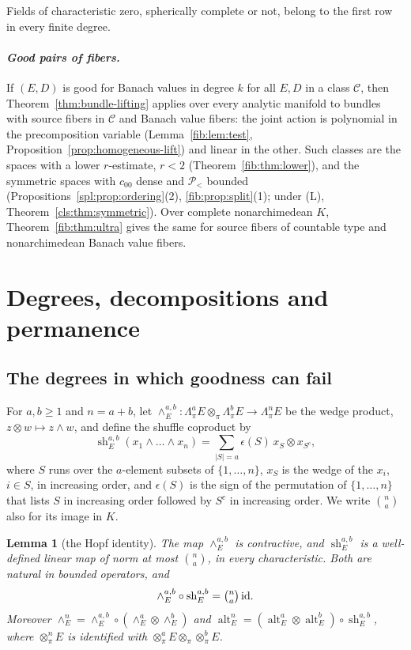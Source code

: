 \documentclass[11pt]{amsart}
\newtheorem{lemma}[theorem]{Lemma}
\theoremstyle{definition}
\theoremstyle{remark}
\numberwithin{equation}{section}
\newcommand{\id}{\mathrm{id}}
\newcommand{\abs}[1]{\lvert #1\rvert}
\newcommand{\cC}{\mathcal{C}}
\theoremstyle{plain}
\theoremstyle{definition}
\theoremstyle{plain}
\newcommand{\cP}{\mathcal P}
\begin{document}
Fields of characteristic zero, spherically complete or not, belong to the first row in every finite degree.

\paragraph{\textit{Good pairs of fibers.}}
If $(E,D)$ is good for Banach values in degree $k$ for all $E,D$ in a class $\cC$, then Theorem~\ref{thm:bundle-lifting}
applies over every analytic manifold to bundles with source fibers in $\cC$ and Banach value fibers: the joint action is
polynomial in the precomposition variable (Lemma~\ref{fib:lem:test}, Proposition~\ref{prop:homogeneous-lift}) and linear
in the other. Such classes are the spaces with a lower $r$-estimate, $r<2$ (Theorem~\ref{fib:thm:lower}), and the
symmetric spaces with $c_{00}$ dense and $\cP_<$ bounded (Propositions~\ref{spl:prop:ordering}(2), \ref{fib:prop:split}(1);
under \textup{(L)}, Theorem~\ref{cls:thm:symmetric}). Over complete nonarchimedean $K$, Theorem~\ref{fib:thm:ultra} gives
the same for source fibers of countable type and nonarchimedean Banach value fibers.
\section{Degrees, decompositions and permanence}\label{sec:combining}

\subsection{The degrees in which goodness can fail}\label{cmb:ssec:degrees}
For $a,b\ge1$ and $n=a+b$, let $\wedge^{a,b}_E\colon\Lambda^a_\pi E\otimes_\pi\Lambda^b_\pi E\to\Lambda^n_\pi E$ be the
wedge product, $z\otimes w\mapsto z\wedge w$, and define the shuffle coproduct by
\begin{equation}\label{fib:eq:shuffle}
 \operatorname{sh}^{a,b}_E(x_1\wedge\dots\wedge x_n)=\sum_{\abs S=a}\epsilon(S)\,x_S\otimes x_{S^c},
\end{equation}
where $S$ runs over the $a$\nobreakdash-element subsets of $\{1,\dots,n\}$, $x_S$ is the wedge of the $x_i$, $i\in S$, in
increasing order, and $\epsilon(S)$ is the sign of the permutation of $\{1,\dots,n\}$ that lists $S$ in increasing order
followed by $S^c$ in increasing order. We write $\binom na$ also for its image in $K$.

\begin{lemma}[the Hopf identity]\label{fib:lem:hopf}
The map $\wedge^{a,b}_E$ is contractive, and $\operatorname{sh}^{a,b}_E$ is a well-defined linear map of norm at most
$\binom na$, in every characteristic. Both are natural in bounded operators, and
\begin{equation}\label{fib:eq:hopf}
 \wedge^{a,b}_E\circ\operatorname{sh}^{a,b}_E=\tbinom na\,\id.
\end{equation}
Moreover $\wedge^n_E=\wedge^{a,b}_E\circ(\wedge^a_E\otimes\wedge^b_E)$ and
$\operatorname{alt}^n_E=(\operatorname{alt}^a_E\otimes\operatorname{alt}^b_E)\circ\operatorname{sh}^{a,b}_E$, where
$\otimes^n_\pi E$ is identified with $\otimes^a_\pi E\otimes_\pi\otimes^b_\pi E$.
\end{lemma}
\end{document}
